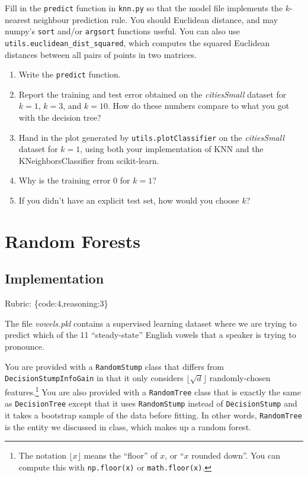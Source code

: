 \documentclass{article}
\def\rubric#1{\gre{Rubric: \{#1\}}}{}
\def\blu#1{{\color{blu}#1}}
\def\gre#1{{\color{gre}#1}}
\def\enum#1{\begin{enumerate}#1\end{enumerate}}
\begin{document}
Fill in the \texttt{predict} function in \texttt{knn.py} so that the model file implements the $k$-nearest neighbour prediction rule.
You should Euclidean distance, and may numpy's \texttt{sort} and/or \texttt{argsort} functions useful.
You can also use \texttt{utils.euclidean\string_dist\string_squared}, which computes the squared Euclidean distances between all pairs of points in two matrices.
\blu{
\enum{
\item Write the \texttt{predict} function.
\item Report  the training and test error obtained on the \emph{citiesSmall} dataset for $k=1$, $k=3$, and $k=10$. How do these numbers compare to what you got with the decision tree?
\item Hand in the plot generated by \texttt{utils.plotClassifier} on the \emph{citiesSmall} dataset for $k=1$, using both your implementation of KNN and the KNeighborsClassifier from scikit-learn.
\item Why is the training error $0$ for $k=1$?
\item If you didn't have an explicit test set, how would you choose $k$?
}}


\section{Random Forests}

\subsection{Implementation}
\rubric{code:4,reasoning:3}

The file \emph{vowels.pkl} contains a supervised learning dataset where we are trying to predict which of the 11 ``steady-state'' English vowels that a speaker is trying to pronounce.

You are provided with a \texttt{RandomStump} class that differs from
\texttt{DecisionStumpInfoGain} in that
it only considers $\lfloor \sqrt{d} \rfloor$ randomly-chosen features.\footnote{The notation $\lfloor x\rfloor$ means the ``floor'' of $x$, or ``$x$ rounded down''. You can compute this with \texttt{np.floor(x)} or \texttt{math.floor(x)}.}
You are also provided with a \texttt{RandomTree} class that is exactly the same as
\texttt{DecisionTree} except that it uses \texttt{RandomStump} instead of
\texttt{DecisionStump} and it takes a bootstrap sample of the data before fitting.
In other words, \texttt{RandomTree} is the entity we discussed in class, which
makes up a random forest.
\end{document}
